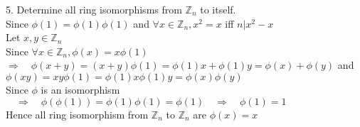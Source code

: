 \documentclass[12pt]{book}
\begin{document}
\begin{CJK}{UTF8}{bsmi}
5. Determine all ring isomorphisms from $\mathbb{Z}_n$ to itself. \\
Since $\phi(1)=\phi(1)\phi(1)$ and $\forall x\in\mathbb{Z}_n, x^2=x$ iff $n|x^2-x$ \\
Let $x, y\in\mathbb{Z}_n$ \\
Since $\forall x\in\mathbb{Z}_n, \phi(x)=x\phi(1)$ \\
$\Rightarrow\quad\phi(x+y)=(x+y)\phi(1)=\phi(1)x+\phi(1)y=\phi(x)+\phi(y)$ and $\phi(xy)=xy\phi(1)=\phi(1)x\phi(1)y=\phi(x)\phi(y)$ \\
Since $\phi$ is an isomorphism$\quad\Rightarrow\quad\phi(\phi(1))=\phi(1)\phi(1)=\phi(1)\quad\Rightarrow\quad\phi(1)=1$ \\
Hence all ring isomorphism from $\mathbb{Z}_n$ to $\mathbb{Z}_n$ are $\phi(x)=x$ \\

\end{CJK}
\end{document}
